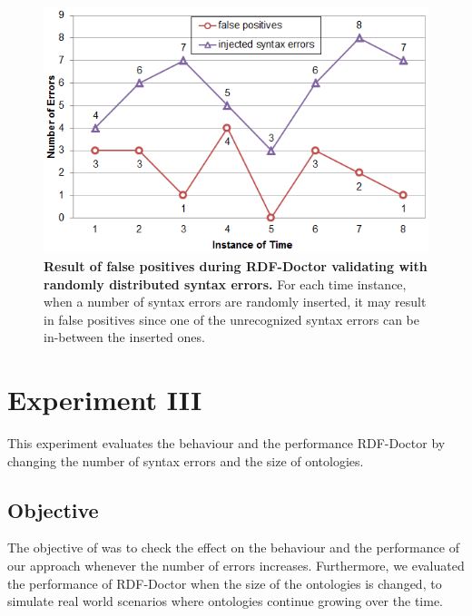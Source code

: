 \begin{figure}[ht]
	\begin{center}
		\includegraphics[scale=0.9,angle=0]{images/Experiment02-03.png}
				\vspace*{-4mm}

		\caption{\textbf{Result of false positives during RDF-Doctor validating with randomly distributed syntax errors.}
		For each time instance, when a number of syntax errors are randomly inserted, it may result in false positives since one of the unrecognized syntax errors can be in-between the inserted ones.} 
		\label{Fig:Experiment02-03}
	\end{center}
\end{figure}
 


\section{Experiment III}

This experiment evaluates the behaviour and the performance RDF-Doctor by changing the number of syntax errors and the size of ontologies. 

\subsection{Objective}
The objective of was to check the effect on the behaviour and the performance of our approach whenever the number of errors increases.
Furthermore, we evaluated the performance of RDF-Doctor when the size of the ontologies is changed, to simulate real world scenarios where ontologies continue growing over the time.



